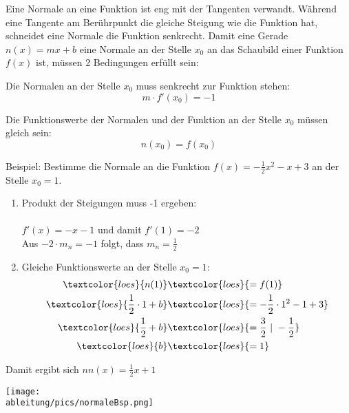 Eine Normale an eine Funktion ist eng mit der Tangenten verwandt. Während eine Tangente am Berührpunkt die gleiche Steigung wie die Funktion hat, schneidet eine Normale die Funktion senkrecht. Damit eine Gerade \(n(x)=mx+b\) eine Normale an der Stelle \(x_0\) an das Schaubild einer Funktion \(f(x)\) ist, müssen 2 Bedingungen erfüllt sein:
\begin{tcolorbox}
	\textcolor{loestc}{Die Normalen an der Stelle \(x_0\) muss senkrecht zur Funktion stehen:
		\[m\cdot f'(x_0)=-1\]}
\end{tcolorbox}
\begin{tcolorbox}
	\textcolor{loestc}{Die Funktionswerte der Normalen und der Funktion an der Stelle \(x_0\) müssen gleich sein:
		\[n(x_0)=f(x_0)\]}
\end{tcolorbox}
Beispiel: Bestimme die Normale an die Funktion \(f(x)=-\frac{1}{2}x^2-x+3\) an der Stelle \(x_0=1\).\vspace{0.5cm}
\begin{minipage}{\textwidth}
	\begin{minipage}{0.5\textwidth}
		\begin{enumerate}
			\item Produkt der Steigungen muss -1 ergeben:\\
			\\
			\textcolor{loes}{\(f'(x)=-x-1\) und damit \(f'(1)=-2\)}\\
			\textcolor{loes}{Aus \(-2\cdot m_n = -1\) folgt, dass \(m_n=\frac{1}{2}\)}
			\\
			\item Gleiche Funktionswerte an der Stelle \(x_0=1\):\\
			\begin{align*}
				\textcolor{loes}{n(1)}&\textcolor{loes}{=f(1)}\\
				\textcolor{loes}{\frac{1}{2}\cdot 1+b}&\textcolor{loes}{=-\frac{1}{2}\cdot 1^2-1+3}\\
				\textcolor{loes}{\frac{1}{2}+b}&\textcolor{loes}{=\frac{3}{2}\ \vert\ -\frac{1}{2}}\\
				\textcolor{loes}{b}&\textcolor{loes}{=1}
			\end{align*}
		\end{enumerate}
		\textcolor{loes}{Damit ergibt sich \(nn(x)=\frac{1}{2}x+1\)}
	\end{minipage}
	\begin{minipage}{0.5\textwidth}
		\centering\texttt{[image: \\ableitung/pics/normaleBsp.png]}
	\end{minipage}
\end{minipage}\newpage
